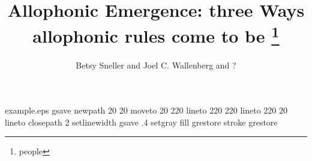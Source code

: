 %
%
%
%
%
\begin{filecontents*}{example.eps}
gsave
newpath
  20 20 moveto
  20 220 lineto
  220 220 lineto
  220 20 lineto
closepath
2 setlinewidth
gsave
  .4 setgray fill
grestore
stroke
grestore
\end{filecontents*}
%
\RequirePackage{fix-cm}
%
\documentclass{svjour3}                     %
%
\smartqed  %
%
\usepackage{mhsetup}
\usepackage{amsmath}
\usepackage{mathtools}
\usepackage{natbib}
\usepackage{graphicx}
\usepackage{float}
\usepackage{qtree}
\usepackage[utf8]{inputenc}
\usepackage{gb4e}
\usepackage[T1]{fontenc}
\usepackage{ tipa }
\newcommand{\noteme}[1]{\noindent \textbf{[[JCW:  #1 ]]}}
\renewcommand{\theequation}{\Alph{equation}}




\title{Allophonic Emergence: three Ways allophonic rules come to be
\thanks{people}}


\author{Betsy Sneller and Joel C. Wallenberg and ?}




